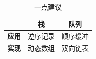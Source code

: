 \begin{frame}
    \frametitle{\insertsectionhead}
        \begin{table}
            \small
            \caption{一点建议}
            \label{tab:stack_queue_suggestions}
            \begin{tabular}{rcc}
                \toprule
                & \textbf{栈} & \textbf{队列} \\
                \midrule
                \textbf{应用} & 逆序记录 & 顺序缓冲 \\
                \textbf{实现} & 动态数组 & 双向链表 \\
                \bottomrule
            \end{tabular}
        \end{table}
\end{frame}